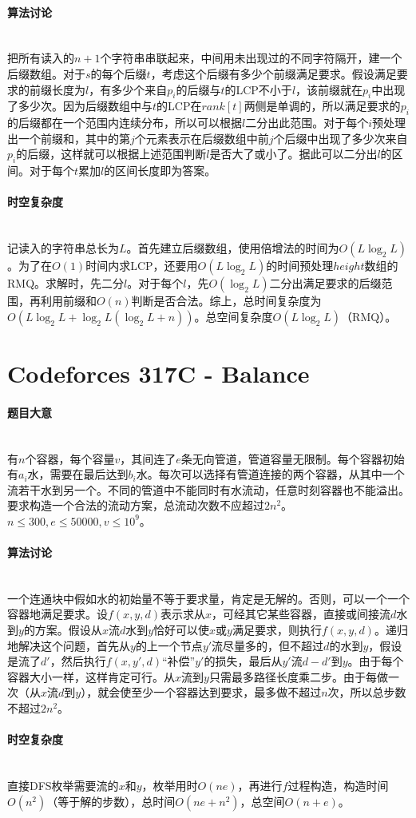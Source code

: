 \documentclass[UTF8]{ctexart}
\newcommand{\myparagraph}[1]{\paragraph{#1}\mbox{}\\}
\theoremstyle{nonumberplain}
\begin{document}
		\myparagraph{算法讨论}
		
			把所有读入的$n+1$个字符串串联起来，中间用未出现过的不同字符隔开，建一个后缀数组。对于$s$的每个后缀$t$，考虑这个后缀有多少个前缀满足要求。假设满足要求的前缀长度为$l$，有多少个来自$p_i$的后缀与$t$的LCP不小于$l$，该前缀就在$p_i$中出现了多少次。因为后缀数组中与$t$的LCP在$rank[t]$两侧是单调的，所以满足要求的$p_i$的后缀都在一个范围内连续分布，所以可以根据$l$二分出此范围。对于每个$i$预处理出一个前缀和，其中的第$j$个元素表示在后缀数组中前$j$个后缀中出现了多少次来自$p_i$的后缀，这样就可以根据上述范围判断$l$是否大了或小了。据此可以二分出$l$的区间。对于每个$t$累加$l$的区间长度即为答案。
		
		\myparagraph{时空复杂度}
		
			记读入的字符串总长为$L$。首先建立后缀数组，使用倍增法的时间为$O(L\log_2L)$。为了在$O(1)$时间内求LCP，还要用$O(L\log_2L)$的时间预处理$height$数组的RMQ。求解时，先二分$l$。对于每个$l$，先$O(\log_2L)$二分出满足要求的后缀范围，再利用前缀和$O(n)$判断是否合法。综上，总时间复杂度为$O(L\log_2L+\log_2L(\log_2L+n))$。总空间复杂度$O(L\log_2L)$（RMQ）。
	
	\section{Codeforces 317C - Balance}
	
		\myparagraph{题目大意}
		
			有$n$个容器，每个容量$v$，其间连了$e$条无向管道，管道容量无限制。每个容器初始有$a_i$水，需要在最后达到$b_i$水。每次可以选择有管道连接的两个容器，从其中一个流若干水到另一个。不同的管道中不能同时有水流动，任意时刻容器也不能溢出。要求构造一个合法的流动方案，总流动次数不应超过$2n^2$。$n \leq 300, e \leq 50000, v \leq 10^9$。
		
		\myparagraph{算法讨论}
		
			一个连通块中假如水的初始量不等于要求量，肯定是无解的。否则，可以一个一个容器地满足要求。设$f(x,y,d)$表示求从$x$，可经其它某些容器，直接或间接流$d$水到$y$的方案。假设从$x$流$d$水到$y$恰好可以使$x$或$y$满足要求，则执行$f(x,y,d)$。递归地解决这个问题，首先从$y$的上一个节点$y'$流尽量多的，但不超过$d$的水到$y$，假设是流了$d'$，然后执行$f(x,y',d)$“补偿”$y'$的损失，最后从$y'$流$d-d'$到$y$。由于每个容器大小一样，这样肯定可行。从$x$流到$y$只需最多路径长度乘二步。由于每做一次（从$x$流$d$到$y$），就会使至少一个容器达到要求，最多做不超过$n$次，所以总步数不超过$2n^2$。
		
		\myparagraph{时空复杂度}
		
			直接DFS枚举需要流的$x$和$y$，枚举用时$O(ne)$，再进行$f$过程构造，构造时间$O(n^2)$（等于解的步数），总时间$O(ne+n^2)$，总空间$O(n+e)$。
	
\end{document}

